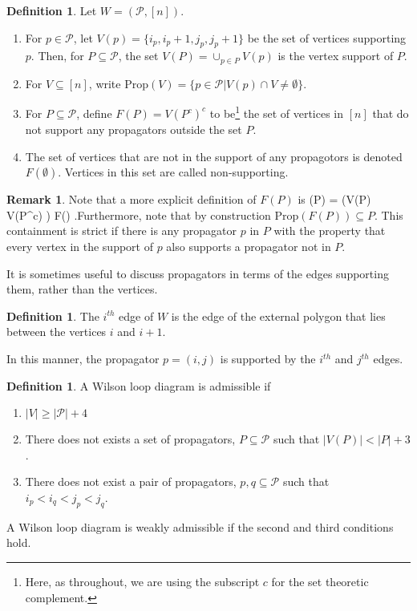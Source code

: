 \documentclass[11pt]{article}
\def\bas #1\eas{\begin{align*} #1 \end{align*}}
\newcommand{\cP}{\mathcal{P}}
\newcommand{\Prop}{\textrm{Prop}}
\theoremstyle{remark}
\theoremstyle{definition}
\newtheorem{dfn}[thm]{Definition}
\newtheorem{rmk}[thm]{Remark}
\begin{document}
\begin{dfn} \label{VPropdfn}
Let $W = (\cP, [n])$.
\begin{enumerate}
\item For $p \in \cP$, let $V(p) = \{i_p, i_p+1, j_p, j_p+1\}$ be the set of vertices supporting $p$. Then, for $P \subseteq \cP$, the set $V(P) = \cup_{p \in P} V(p)$ is the vertex support of $P$.
\item For $V \subseteq [n]$, write $\Prop(V) = \{ p \in \cP | V(p) \cap V \neq \emptyset \} $.
\item For $P \subseteq \cP$, define $F(P) = V(P^c)^c$ to be\footnote{Here, as throughout, we are using the subscript $c$ for the set theoretic complement.} the set of vertices in $[n]$ that do not support any propagators outside the set $P$.
\item The set of vertices that are not in the support of any propagotors is denoted  $F(\emptyset)$. Vertices in this set are called non-supporting.  
\end{enumerate}
\end{dfn}



\begin{rmk}\label{alt F(P) rmk}
Note that a more explicit definition of $F(P)$ is \bas F(P)  = \big(V(P) \setminus V(P^c) \big) \cup F(\emptyset) \;.\eas Furthermore, note that by construction $\Prop(F(P)) \subseteq P$.  This containment is strict if there is any propagator $p$ in $P$ with the property that every vertex in the support of $p$ also supports a propagator not in $P$.
\end{rmk}

It is sometimes useful to discuss propagators in terms of the edges supporting them, rather than the vertices.

\begin{dfn}
The $i^{th}$ edge of $W$ is the edge of the external polygon that lies between the vertices $i$ and $i+1$.
\end{dfn}

In this manner, the propagator $p = (i, j)$ is supported by the $i^{th}$ and $j^{th}$ edges.

\begin{dfn}\label{admisdfn}
A Wilson loop diagram is admissible if \begin{enumerate}
\item $|V| \geq |\cP| + 4$
\item There does not exists a set of propagators, $P \subseteq \cP$ such that $|V(P)| < |P| + 3$.
\item There does not exist a pair of propagators, $p, q \subseteq \cP$ such that $i_p < i_q < j_p <j_q$.
\end{enumerate}
A Wilson loop diagram is weakly admissible if the second and third conditions hold.
 \end{dfn}
\end{document}
